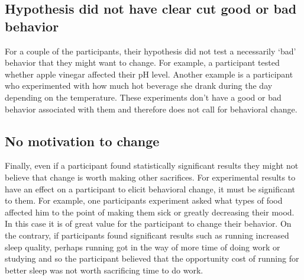     \subsection{Hypothesis did not have clear cut good or bad behavior}
    For a couple of the participants, their hypothesis did not test a necessarily \enquote*{bad} behavior that they might want to change. For example, a participant tested whether apple vinegar affected their pH level. Another example is a participant who experimented with how much hot beverage she drank during the day depending on the temperature. These experiments don’t have a good or bad behavior associated with them and therefore does not call for behavioral change. 
    \subsection{No motivation to change}
    Finally, even if a participant found statistically significant results they might not believe that change is worth making other sacrifices. For experimental results to have an effect on a participant to elicit behavioral change, it must be significant to them. For example, one participants experiment asked what types of food affected him to the point of making them sick or greatly decreasing their mood. In this case it is of great value for the participant to change their behavior. On the contrary, if participants found significant results such as running increased sleep quality, perhaps running got in the way of more time of doing work or studying and so the participant believed that the opportunity cost of running for better sleep was not worth sacrificing time to do work. 
